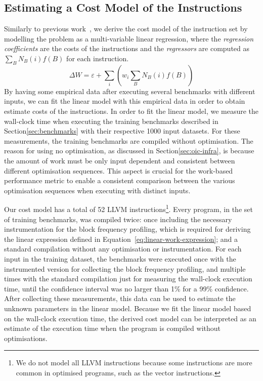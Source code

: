 \subsection{Estimating a Cost Model of the Instructions}

Similarly to previous work~\citep{giusto01,powell09,brandolese11}, we derive the cost model of the instruction set by modelling the problem as a multi-variable linear regression, where the \textit{regression coefficients} are the costs of the instructions and the \textit{regressors} are computed as $\sum_B N_B(i)f(B)$ for each instruction.
\begin{equation}\label{eq:linear-work-expression}
\Delta W = \varepsilon + \sum_{i} \left(w_i \sum_{B} N_B(i)f(B)\right)
\end{equation}
By having some empirical data after executing several benchmarks with different inputs, we can fit the linear model with this empirical data in order to obtain estimate costs of the instructions.
In order to fit the linear model, we measure the wall-clock time when executing the training benchmarks described in Section\ref{sec:benchmarks} with their respective 1000 input datasets.
For these measurements, the training benchmarks are compiled without optimisation.
The reason for using no optimisation, as discussed in Section\ref{sec:oic-infra}, is because the amount of work must be only input dependent and consistent between different optimisation sequences.
This aspect is crucial for the work-based performance metric to enable a consistent comparison between the various optimisation sequences when executing with distinct inputs.

Our cost model has a total of 52 LLVM instructions\footnote{We do not model all LLVM instructions because some instructions are more common in optimised programs, such as the vector instructions.}.
Every program, in the set of training benchmarks, was compiled twice: once including the necessary instrumentation for the block frequency profiling, which is required for deriving the linear expression defined in Equation~\ref{eq:linear-work-expression};
and a standard compilation without any optimisation or instrumentation.
For each input in the training dataset, the benchmarks were executed once with the instrumented version for collecting the block frequency profiling, and multiple times with the standard compilation just for measuring the wall-clock execution time, until the confidence interval was no larger than 1\% for a 99\% confidence.
After collecting these measurements, this data can be used to estimate the unknown parameters in the linear model.
Because we fit the linear model based on the wall-clock execution time, the derived cost model can be interpreted as an estimate of the execution time when the program is compiled without optimisations.

